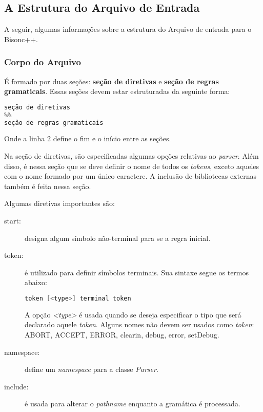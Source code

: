 \begin{apendicesenv}
\subsection{A Estrutura do Arquivo de Entrada}
A seguir, algumas informações sobre a estrutura do Arquivo de entrada para o Bisonc++.

\subsubsection{Corpo do Arquivo}

É formado por duas seções: \textbf{seção de diretivas} e \textbf{seção de regras gramaticais}. Essas seções devem estar estruturadas da seguinte forma:

\begin{lstlisting}[language=c, caption=Corpo do arquivo do bisonc++]
seção de diretivas
%%
seção de regras gramaticais
\end{lstlisting}
\par
\indent Onde a linha $2$ define o fim e o início entre as seções.

Na seção de diretivas, são especificadas algumas opções relativas ao \textit{parser}. Além disso, é nessa seção que se deve definir o nome de todos os \textit{tokens}, exceto aqueles com o nome formado por um único caractere. A inclusão de bibliotecas externas também é feita nessa seção.

\par
\indent Algumas diretivas importantes são:

\begin{description}
\item[start:] designa algum símbolo não-terminal para se a regra inicial.
\item[token:] é utilizado para definir símbolos terminais. Sua sintaxe segue os termos abaixo:

\begin{lstlisting}[language=c,  caption=Sintaxe]
token [<type>] terminal token
\end{lstlisting}
A opção \textit{<type>} é usada quando se deseja especificar o tipo que será declarado aquele \textit{token}. Alguns nomes não devem ser usados como \textit{token}: ABORT, ACCEPT, ERROR, clearin, debug, error, setDebug.
\item[namespace:] define um \textit{namespace} para a classe \textit{Parser}.
\item[include:] é usada para alterar o \textit{pathname} enquanto a gramática é processada.
\end{description}


\end{apendicesenv}
